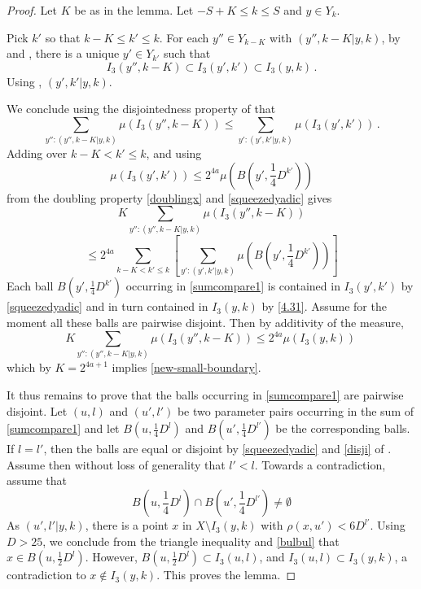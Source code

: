 \documentclass[10pt,a4paper]{article}
\theoremstyle{plain}
\theoremstyle{definition}
\numberwithin{equation}{subsection}
\newcommand{\leanok}{}
\begin{document}
\begin{proof}
\leanok
Let $K$ be as in the lemma. Let $-S+K\le k\le S$ and $y\in Y_k$.

Pick $k'$ so that $k-K\le k'\le k$.
For each $y''\in Y_{k-K}$ with $(y'',k-K| y,k)$,
by  and , there is a unique $y'\in Y_{k'}$ such that
\begin{equation}\label{4.31}
    I_3(y'',k-K)\subset I_3(y',k')\subset I_3(y,k)\, .
\end{equation}
Using , $(y',k'|y,k)$.

We conclude using the disjointedness property of
 that
\begin{equation}\label{scalecompare}
    \sum_{y'': (y'',k-K|y,k)}\mu(I_3(y'',k-K))
   \le
\sum_{y': (y',k'|y,k)}
\mu(I_3(y',k')) \, .
   \end{equation}
Adding over $k-K<k'\le k$, and using
\[\mu(I_3(y',k'))\le 2^{4a} \mu(B(y', \frac 14 D^{k'}))\]
from the doubling property \eqref{doublingx} and
\eqref{squeezedyadic} gives
\begin{equation}\label{sumcompare}
    K\sum_{y'': (y'',k-K|y,k)}
    \mu(I_3(y'',k-K))
\end{equation}
\begin{equation}\label{sumcompare1}
    \le 2^{4a} \sum_{k-K<k'\le k}
   \left[ \sum_{y': (y',k'|y,k)}
\mu(B(y', \frac 14 D^{k'}))\right]
\end{equation}
Each ball $B(y', \frac 14 D^{k'})$ occurring in
\eqref{sumcompare1} is contained in $I_3(y',k')$
by \eqref{squeezedyadic} and in turn contained in
$I_3(y,k)$ by \eqref{4.31}. Assume for the moment all these balls are pairwise disjoint. Then
by additivity of the measure,
\begin{equation}
    K\sum_{y'': (y'',k-K|y,k)}
    \mu(I_3(y'',k-K))
    \le 2^{4a}
\mu(I_3(y,k))\,
\end{equation}
which by $K=2^{4a+1}$ implies \eqref{new-small-boundary}.

It thus remains to prove that the balls
occurring in
\eqref{sumcompare1} are pairwise disjoint.
Let $(u,l)$ and $(u',l')$ be two parameter pairs occurring
in the sum of \eqref{sumcompare1} and let
$ B(u, \frac 14 D^l)$ and $B({u'}, \frac 14 D^{l'})$
be the corresponding balls. If
$l=l'$, then the balls are equal or disjoint by
\eqref{squeezedyadic} and \eqref{disji} of . Assume then without loss of generality that $l'<l$. Towards a contradiction, assume that
\begin{equation}\label{bulbul}
    B(u, \frac 14 D^l)\cap B({u'}, \frac 14 D^{l'})\neq \emptyset
\end{equation}
As $(u',l'|y,k)$, there is a point $x$ in
$X\setminus I_3(y,k)$ with $\rho(x,u')<6D^{l'}$.
Using $D>25$, we conclude from the triangle inequality and \eqref{bulbul} that
$x\in B(u,\frac 12D^l)$. However, $B(u,\frac 12 D^l)\subset I_3(u,l)$,
and $I_3(u,l)\subset I_3(y,k)$, a contradiction to
$x\not\in I_3(y,k)$.
This proves the lemma.
\end{proof}
\end{document}
